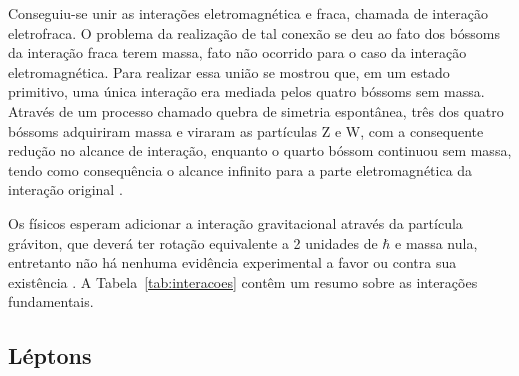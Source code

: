 \begin{table}
\centering
{}
\caption[As quatro interações fundamentais]{As quatro interações fundamentais. A intensidade relativa se dá em
relação a interação forte. Adaptado de \cite{Beiser}.}
\label{tab:interacoes}
\end{table}

Conseguiu-se unir as interações eletromagnética e fraca, chamada de interação
eletrofraca. O problema da realização de tal conexão se deu ao fato dos
bóssoms da interação fraca terem massa, fato não ocorrido para o caso da
interação eletromagnética. Para realizar essa união se mostrou que, em um
estado primitivo, uma única interação era mediada pelos quatro bóssoms sem massa.
Através de um processo chamado quebra de simetria espontânea, três dos quatro
bóssoms adquiriram massa e viraram as partículas Z e W, com a consequente
redução no alcance de interação, enquanto o quarto bóssom continuou sem massa,
tendo como consequência o alcance infinito para a parte eletromagnética da
interação original \cite{Beiser}.


Os físicos esperam adicionar a interação gravitacional
através da partícula gráviton, que deverá ter rotação equivalente a 2
unidades de $\hbar$ e massa nula, entretanto não há nenhuma evidência 
experimental a favor ou contra sua existência \cite{Beiser}.
A Tabela~\ref{tab:interacoes} contêm um resumo sobre as interações
fundamentais.

\subsection{Léptons}
\label{ssec:leptons}

